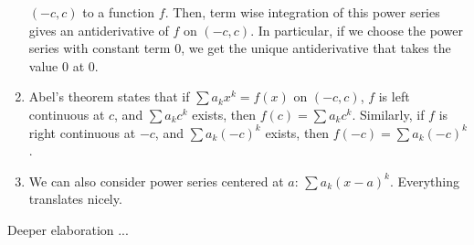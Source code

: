 \documentclass[10pt]{amsart}
\begin{document}
\begin{enumerate}
  $(-c,c)$ to a function $f$. Then, term wise integration of this
  power series gives an antiderivative of $f$ on $(-c,c)$. In
  particular, if we choose the power series with constant term $0$, we
  get the unique antiderivative that takes the value $0$ at $0$.
\item Abel's theorem states that if $\sum a_kx^k = f(x)$ on $(-c,c)$,
  $f$ is left continuous at $c$, and $\sum a_kc^k$ exists, then $f(c)
  = \sum a_kc^k$. Similarly, if $f$ is right continuous at $-c$, and
  $\sum a_k(-c)^k$ exists, then $f(-c) = \sum a_k(-c)^k$.
\item We can also consider power series centered at $a$: $\sum a_k (x
  - a)^k$. Everything translates nicely.
\end{enumerate}

Deeper elaboration ...
\end{document}

